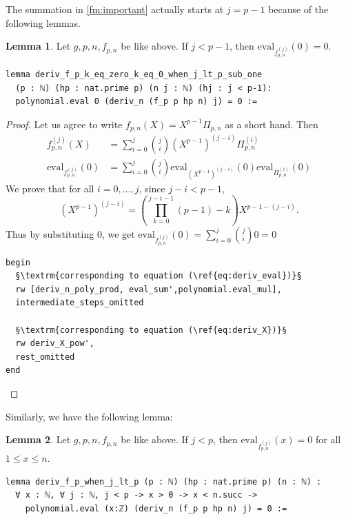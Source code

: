\documentclass{report}
\theoremstyle{definition}
\newtheorem{lemma}{Lemma}[section]
\begin{document}
The summation in \ref{fm:important} actually starts at $j=p-1$ because of the following lemmas.
\begin{lemma}\label{lemma:j_lt_p_sub_one}
Let $g,p,n,f_{p,n}$ be like above. If $j < p-1$, then $\mathrm{eval}_{f_{p,n}^{(j)}}(0) = 0$.

\begin{verbatim}
lemma deriv_f_p_k_eq_zero_k_eq_0_when_j_lt_p_sub_one 
  (p : ℕ) (hp : nat.prime p) (n j : ℕ) (hj : j < p-1): 
  polynomial.eval 0 (deriv_n (f_p p hp n) j) = 0 :=
\end{verbatim}
\end{lemma}
\begin{proof}
Let us agree to write $f_{p,n}(X)=X^{p-1}\Pi_{p,n}$ as a short hand. Then 
\begin{equation}\label{eq:deriv_eval}
\begin{aligned}
f_{p,n}^{(j)}(X)&=\sum_{i=0}^j{j\choose i}(X^{p-1})^{(j-i)}\Pi_{p,n}^{(i)} \\
\mathrm{eval}_{f_{p,n}^{(j)}}(0)&=\sum_{i=0}^j{j\choose i}\mathrm{eval}_{(X^{p-1})^{(j-i)}}(0)\mathrm{eval}_{\Pi_{p,n}^{(i)}}(0)
\end{aligned}
\end{equation}
We prove that for all $i=0,\dots,j$, since $j-i<p-1$,
\begin{equation}\label{eq:deriv_X}
(X^{p-1})^{(j-i)}=\left(\prod_{k=0}^{j-i-1}{(p-1)-k}\right){X^{p-1-(j-i)}}. 
\end{equation}
Thus by substituting $0$, we get $\mathrm{eval}_{f_{p,n}^{(j)}}(0)=\sum_{i=0}^j{j\choose i}0=0$ 
\begin{verbatim}
begin
  §\textrm{corresponding to equation (\ref{eq:deriv_eval})}§
  rw [deriv_n_poly_prod, eval_sum',polynomial.eval_mul], 
  intermediate_steps_omitted

  §\textrm{corresponding to equation (\ref{eq:deriv_X})}§
  rw deriv_X_pow',
  rest_omitted
end
\end{verbatim}
\end{proof}

Similarly, we have the following lemma:
\begin{lemma}\label{lemma:lt_p_k_ge_1}
Let $g,p,n,f_{p,n}$ be like above. If $j < p$, then $\mathrm{eval}_{f_{p,n}^{(j)}}(x) = 0$ for all $1\le x\le n$.
\begin{verbatim}
lemma deriv_f_p_when_j_lt_p (p : ℕ) (hp : nat.prime p) (n : ℕ) : 
  ∀ x : ℕ, ∀ j : ℕ, j < p -> x > 0 -> x < n.succ -> 
    polynomial.eval (x:ℤ) (deriv_n (f_p p hp n) j) = 0 :=
\end{verbatim}
\end{lemma}
\end{document}
